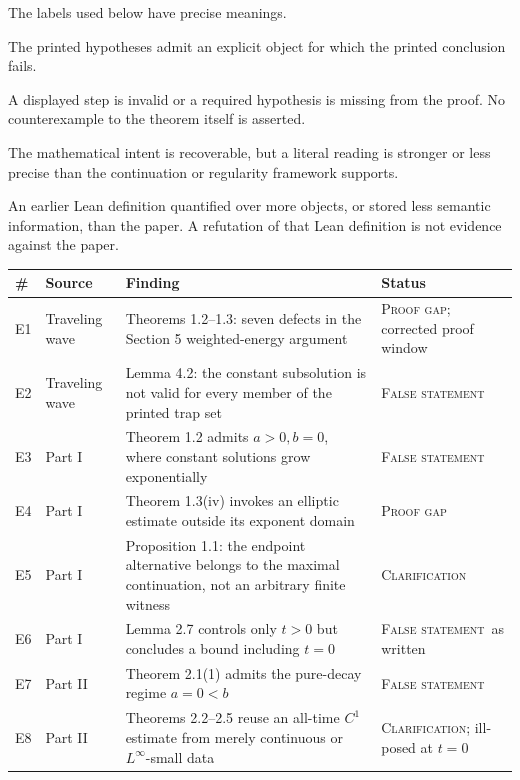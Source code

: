 \documentclass[11pt]{article}
\newcommand{\False}{\textsc{False statement}}
\newcommand{\Gap}{\textsc{Proof gap}}
\newcommand{\Clarify}{\textsc{Clarification}}
\newcommand{\Interface}{\textsc{Interface only}}
\begin{document}
\noindent The labels used below have precise meanings.
\begin{description}[leftmargin=2.1em,style=nextline]
\item[\False] The printed hypotheses admit an explicit object for which the
  printed conclusion fails.
\item[\Gap] A displayed step is invalid or a required hypothesis is missing
  from the proof.  No counterexample to the theorem itself is asserted.
\item[\Clarify] The mathematical intent is recoverable, but a literal reading
  is stronger or less precise than the continuation or regularity framework
  supports.
\item[\Interface] An earlier Lean definition quantified over more objects, or
  stored less semantic information, than the paper.  A refutation of that Lean
  definition is not evidence against the paper.
\end{description}

\begin{center}
\renewcommand{\arraystretch}{1.18}
\begin{longtable}{@{}p{}p{}p{}p{}@{}}
\toprule
\# & Source & Finding & Status\\
\midrule
\endhead
E1 & Traveling wave & Theorems 1.2--1.3: seven defects in the Section 5
  weighted-energy argument & \Gap; corrected proof window\\
E2 & Traveling wave & Lemma 4.2: the constant subsolution is not valid for
  every member of the printed trap set & \False\\
E3 & Part I & Theorem 1.2 admits \(a>0,b=0\), where constant solutions grow
  exponentially & \False\\
E4 & Part I & Theorem 1.3(iv) invokes an elliptic estimate outside its exponent
  domain & \Gap\\
E5 & Part I & Proposition 1.1: the endpoint alternative belongs to the maximal
  continuation, not an arbitrary finite witness & \Clarify\\
E6 & Part I & Lemma 2.7 controls only \(t>0\) but concludes a bound including
  \(t=0\) & \False\ as written\\
E7 & Part II & Theorem 2.1(1) admits the pure-decay regime \(a=0<b\) & \False\\
E8 & Part II & Theorems 2.2--2.5 reuse an all-time \(C^1\) estimate from merely
  continuous or \(L^\infty\)-small data & \Clarify; ill-posed at \(t=0\)\\
\bottomrule
\end{longtable}
\end{center}
\end{document}
